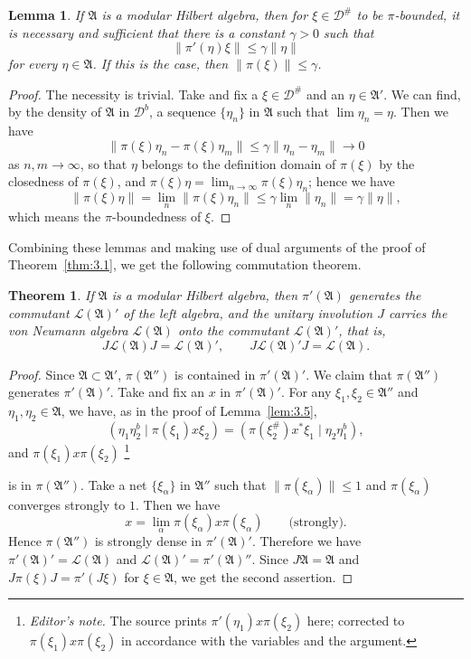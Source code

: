\documentclass[12pt,b5paper,twoside]{article}
\theoremstyle{takesaki}
\newtheorem{theorem}{Theorem}[section]
\newtheorem{lemma}{Lemma}[section]
\numberwithin{equation}{section}
\newcounter{editorialnote}
\newcommand{\ednote}[1]{%
  \stepcounter{editorialnote}%
  \begingroup
  \renewcommand{\thefootnote}{E\arabic{editorialnote}}%
  \footnote{\textit{Editor's note.} #1}%
  \addtocounter{footnote}{-1}%
  \endgroup
}
\begin{document}
\begin{lemma}\label{lem:4.2}
If $\mathfrak A$ is a modular Hilbert algebra, then for
$\xi\in\mathcal D^\#$ to be $\pi$-bounded, it is necessary and
sufficient that there is a constant $\gamma>0$ such that
\[
 \|\pi'(\eta)\xi\|\leq\gamma\|\eta\|
\]
for every $\eta\in\mathfrak A$.  If this is the case, then
$\|\pi(\xi)\|\leq\gamma$.
\end{lemma}

\begin{proof}
The necessity is trivial.  Take and fix a $\xi\in\mathcal D^\#$ and an
$\eta\in\mathfrak A'$.  We can find, by the density of $\mathfrak A$ in
$\mathcal D^b$, a sequence $\{\eta_n\}$ in $\mathfrak A$ such that
$\lim\eta_n=\eta$.  Then we have
\[
 \|\pi(\xi)\eta_n-\pi(\xi)\eta_m\|
 \leq\gamma\|\eta_n-\eta_m\|\longrightarrow0
\]
as $n,m\to\infty$, so that $\eta$ belongs to the definition domain of
$\pi(\xi)$ by the closedness of $\pi(\xi)$, and
$\pi(\xi)\eta=\lim_{n\to\infty}\pi(\xi)\eta_n$; hence we have
\[
 \|\pi(\xi)\eta\|
 =\lim_n\|\pi(\xi)\eta_n\|
 \leq\gamma\lim_n\|\eta_n\|
 =\gamma\|\eta\|,
\]
which means the $\pi$-boundedness of $\xi$.
\end{proof}

Combining these lemmas and making use of dual arguments of the proof of
Theorem~\ref{thm:3.1}, we get the following commutation theorem.

\begin{theorem}\label{thm:4.1}
If $\mathfrak A$ is a modular Hilbert algebra, then $\pi'(\mathfrak A)$
generates the commutant $\mathcal L(\mathfrak A)'$ of the left algebra,
and the unitary involution $J$ carries the von Neumann algebra
$\mathcal L(\mathfrak A)$ onto the commutant
$\mathcal L(\mathfrak A)'$, that is,
\[
 J\mathcal L(\mathfrak A)J=\mathcal L(\mathfrak A)',
 \qquad
 J\mathcal L(\mathfrak A)'J=\mathcal L(\mathfrak A).
\]
\end{theorem}

\begin{proof}
Since $\mathfrak A\subset\mathfrak A'$, $\pi(\mathfrak A'')$ is
contained in $\pi'(\mathfrak A)'$.  We claim that
$\pi(\mathfrak A'')$ generates $\pi'(\mathfrak A)'$.  Take and fix an
$x$ in $\pi'(\mathfrak A)'$.  For any
$\xi_1,\xi_2\in\mathfrak A''$ and $\eta_1,\eta_2\in\mathfrak A$, we
have, as in the proof of Lemma~\ref{lem:3.5},
\[
 (\eta_1\eta_2^b\mid\pi(\xi_1)x\xi_2)
   =(\pi(\xi_2^\#)x^*\xi_1\mid\eta_2\eta_1^b),
\]
and $\pi(\xi_1)x\pi(\xi_2)$\ednote{The source prints
$\pi'(\eta_1)x\pi(\xi_2)$ here; corrected to
$\pi(\xi_1)x\pi(\xi_2)$ in accordance with the variables and the
argument.} is in $\pi(\mathfrak A'')$.  Take a net
$\{\xi_\alpha\}$ in $\mathfrak A''$ such that
$\|\pi(\xi_\alpha)\|\leq1$ and $\pi(\xi_\alpha)$ converges strongly to
$1$.  Then we have
\[
 x=\lim_\alpha\pi(\xi_\alpha)x\pi(\xi_\alpha)
 \qquad\text{(strongly)}.
\]
Hence $\pi(\mathfrak A'')$ is strongly dense in
$\pi'(\mathfrak A)'$.  Therefore we have
$\pi'(\mathfrak A)'=\mathcal L(\mathfrak A)$ and
$\mathcal L(\mathfrak A)'=\pi'(\mathfrak A)''$.  Since
$J\mathfrak A=\mathfrak A$ and
$J\pi(\xi)J=\pi'(J\xi)$ for $\xi\in\mathfrak A$, we get the second
assertion.
\end{proof}
\end{document}
